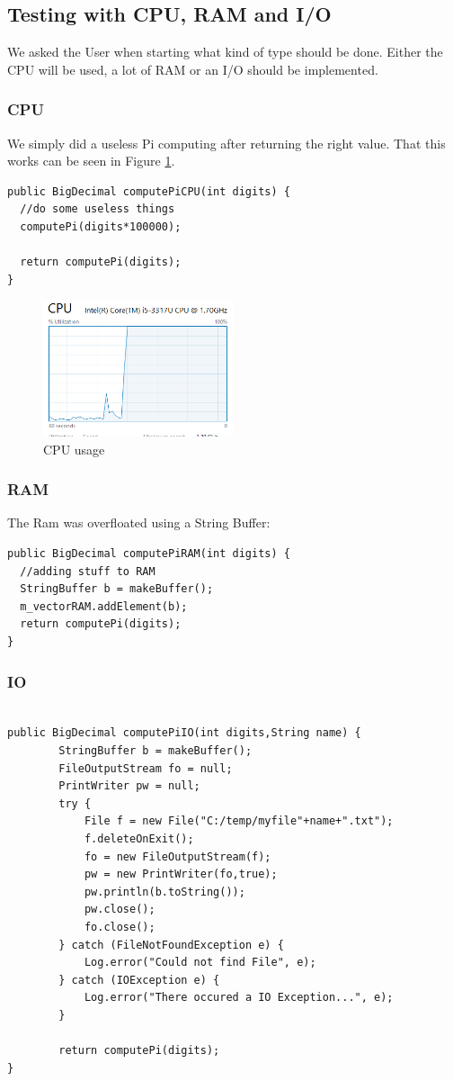 \documentclass[12pt]{article}
\begin{document}
\subsection{Testing with CPU, RAM and I/O} 
We asked the User when starting what kind of type should be done.
Either the CPU will be used, a lot of RAM or an I/O should be implemented. \\
\subsubsection{CPU}
We simply did a useless Pi computing after returning the right value. That this works can be seen in Figure \ref{fig:cpu1}.
\begin{lstlisting}		
public BigDecimal computePiCPU(int digits) {
  //do some useless things
  computePi(digits*100000);
		
  return computePi(digits);
}
\end{lstlisting}
\begin{figure}[here!]
\centering
    \includegraphics[width=0.5\textwidth]{images/cpu1}
    \caption{CPU usage}
    \label{fig:cpu1}
\end{figure}
\subsubsection{RAM}
The Ram was overfloated using a String Buffer: 
\begin{lstlisting}
public BigDecimal computePiRAM(int digits) {
  //adding stuff to RAM
  StringBuffer b = makeBuffer();
  m_vectorRAM.addElement(b);
  return computePi(digits);
}
\end{lstlisting}
\subsubsection{IO}
\begin{lstlisting}

public BigDecimal computePiIO(int digits,String name) {
		StringBuffer b = makeBuffer();
		FileOutputStream fo = null;
		PrintWriter pw = null;
		try {
			File f = new File("C:/temp/myfile"+name+".txt");
			f.deleteOnExit();
			fo = new FileOutputStream(f);
			pw = new PrintWriter(fo,true);
			pw.println(b.toString());
			pw.close();
			fo.close();
		} catch (FileNotFoundException e) {
			Log.error("Could not find File", e);
		} catch (IOException e) {
			Log.error("There occured a IO Exception...", e);
		}
		
		return computePi(digits);
}
\end{lstlisting}
\end{document}
